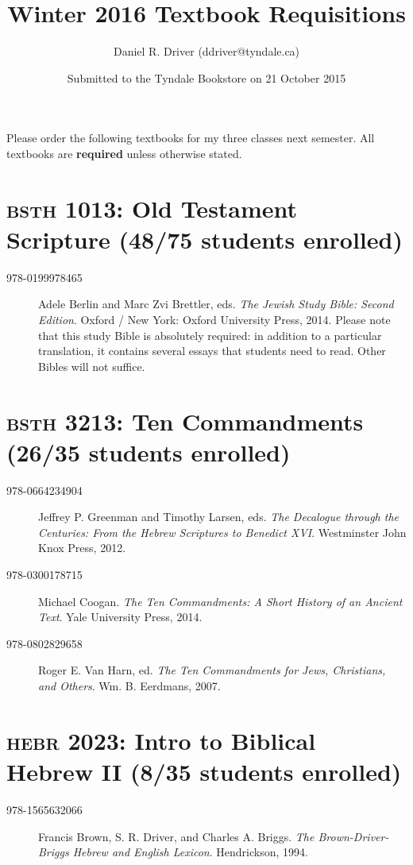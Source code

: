 \documentclass[11pt]{article}
\title{Winter 2016 Textbook Requisitions}
\author{Daniel R. Driver (ddriver@tyndale.ca)}
\date{Submitted to the Tyndale Bookstore on 21 October 2015}
\begin{document}
\maketitle

Please order the following textbooks for my three classes next semester.
All textbooks are \textbf{required} unless otherwise stated.

\section{\textsc{bsth} 1013: Old Testament Scripture (48/75 students enrolled)}

\begin{description}

	\item[978-0199978465] Adele Berlin and Marc Zvi Brettler, eds.
    \emph{The Jewish Study Bible: Second Edition}.
    Oxford / New York: Oxford University Press, 2014.
    Please note that this study Bible is absolutely required: in
    addition to a particular translation, it contains several essays
    that students need to read. Other Bibles will not suffice.

\end{description}

\section{\textsc{bsth} 3213: Ten Commandments (26/35 students enrolled)}

\begin{description}

	\item[978-0664234904] Jeffrey P. Greenman and Timothy Larsen, eds.
	\emph{The Decalogue through the Centuries: From the Hebrew Scriptures to Benedict XVI}.
	Westminster John Knox Press, 2012.

	\item[978-0300178715] Michael Coogan.
    \emph{The Ten Commandments: A Short History of an Ancient Text}.
    Yale University Press, 2014.

	\item[978-0802829658] Roger E. Van Harn, ed.
	\emph{The Ten Commandments for Jews, Christians, and Others}.
	Wm. B. Eerdmans, 2007.

\end{description}

\section{\textsc{hebr} 2023: Intro to Biblical Hebrew II (8/35 students enrolled)}

\begin{description}

	\item[978-1565632066] Francis Brown, S. R. Driver, and Charles A. Briggs.
	\emph{The Brown-Driver-Briggs Hebrew and English Lexicon}.
	Hendrickson, 1994.

\end{description}
\end{document}
